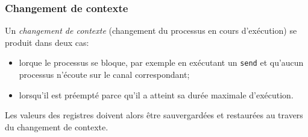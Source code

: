 \documentclass[french, toc]{../cs-classes/cs-classes}
\begin{document}
\subsubsection{Changement de contexte}
Un \emph{changement de contexte} (changement du processus en cours d'exécution) se produit dans deux cas:
\begin{itemize}
    \item lorque le processus se bloque, par exemple en exécutant un \texttt{send} et qu'aucun processus n'écoute sur le canal correspondant;
    \item lorsqu'il est préempté parce qu'il a atteint sa durée maximale d'exécution.
\end{itemize}
Les valeurs des registres doivent alors être sauvergardées et restaurées au travers du changement de contexte.
\end{document}
